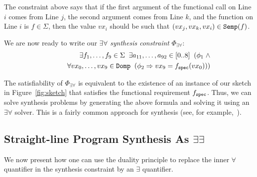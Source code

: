 \documentclass[preprint]{sig-alternate-05-2015}
\def\semp{{\tt{Semp}}}
\def\domp{{\tt{Domp}}}
\def\spec{{\tt{spec}}}
\def\Sig{{\Sigma}}
\begin{document}
\smallskip\noindent
The constraint above says that if
the first argument of the functional call on Line $i$ comes from Line $j$,
the second argument comes from Line $k$, and
the function on Line $i$ is $f\in\Sig$, then
the value $vx_i$ should be such that $(vx_j,vx_k,vx_i)\in \semp(f)$.


We are now ready to write our $\exists\forall$ {\em synthesis constraint} $\Phi_{\exists\forall}$: 
\begin{eqnarray*}
  &&\exists{f_1,\ldots,f_9}\in\Sig\;\;
  \exists{a_{11},\ldots,a_{92}}\in [0..8]\;\;
  (\phi_1 \; \wedge
  \\ && \qquad
  \forall{vx_0,\ldots,vx_9}\in\domp\;\;(\phi_2 \Rightarrow vx_9 = f_\spec(vx_0)))
\end{eqnarray*}

The satisfiability of $\Phi_{\exists\forall}$ is equivalent to the existence 
of an instance of our sketch in Figure~\ref{fig:sketch}
that satisfies the functional requirement $f_\spec$.
Thus, we can solve synthesis problems by generating the above formula
and solving it using an $\exists\forall$ solver.
This is a fairly common approach for synthesis 
(see, for example,~\cite{bitvector}). %

\subsection{Straight-line Program Synthesis As $\exists\exists$}

We now present how one can use the duality principle to replace the inner
$\forall$ quantifier in the synthesis constraint by an $\exists$ quantifier.
\end{document}
